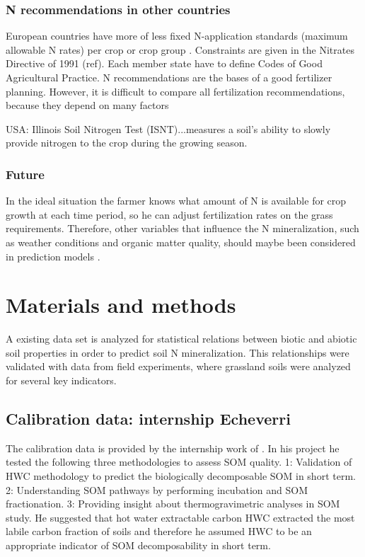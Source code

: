 \documentclass[10pt,twoside,dutch,english]{report}
\begin{document}
\subsection{N recommendations in other countries}
European countries have more of less fixed N-application standards (maximum allowable N rates) per crop or crop group \citep{VanDijk2009}. Constraints are given in the Nitrates Directive of 1991 (ref). Each member state have to define Codes of Good Agricultural Practice. N recommendations are the bases of a good fertilizer planning. However, it is difficult to compare all fertilization recommendations, because they depend on many factors


USA: Illinois Soil Nitrogen Test (ISNT)...measures a soil's ability to slowly provide nitrogen to the crop during the growing season.

\subsection{Future}
 In the ideal situation the farmer knows what amount of N is available for crop growth at each time period, so he can adjust fertilization rates on the grass requirements. Therefore, other variables that influence the N mineralization, such as weather conditions and organic matter quality, should maybe been considered in prediction models \citep{Ros2015}. 

	


	
	
	
	

\chapter{Materials and methods}

A existing data set is analyzed for statistical relations between biotic and abiotic soil properties in order to predict soil N mineralization. This relationships were validated with data from field experiments, where grassland soils were analyzed for several key indicators. 

\section{Calibration data: internship Echeverri}
The calibration data is provided by the internship work of  \citet{Echeverri2014}. In his project he tested the following three methodologies to assess SOM quality. 1: Validation of  HWC methodology to predict the biologically decomposable SOM in short term. 2: Understanding SOM pathways by performing incubation and SOM fractionation. 3: Providing insight about thermogravimetric analyses in SOM study.  He suggested that hot water extractable carbon HWC extracted the most labile carbon fraction of soils and therefore he assumed HWC to be an appropriate indicator of SOM decomposability in short term.
\end{document}
